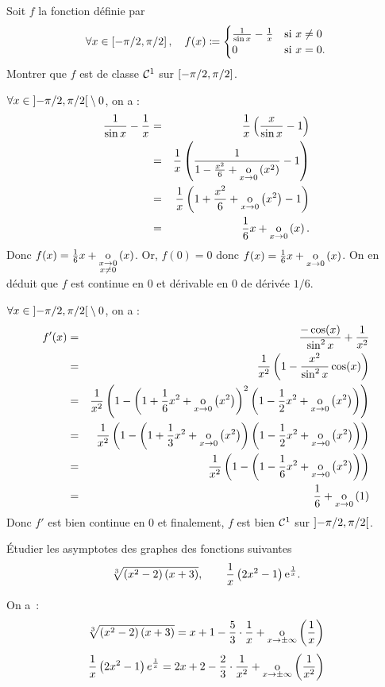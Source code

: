 \documentclass{magnolia}
\begin{document}
Soit $f$ la fonction définie par
\[\forall x\in\left[-\pi/2,\pi/2\right] ,\quad f(x)\coloneqq
  \begin{cases}
  \frac{1}{\sin x}-\frac{1}{x} & \text{si $x\neq 0$}\\
  0 & \text{si $x=0$.}
  \end{cases}\]
Montrer que $f$ est de classe $\mathcal{C}^{1}$ sur $\left[-\pi/2,\pi/2\right]$.

\begin{sol}
$\forall x \in \left]-\pi/2,\pi/2\right[\setminus{0}$, on a :
\begin{eqnarray*}
\frac{1}{\sin x}-\frac{1}{x}&=&\frac{1}{x}\left(\frac{x}{\sin x}-1\right)\\
&=&\frac{1}{x}\left(\frac{1}{1-\frac{x^2}{6}+\underset{x \rightarrow 0}{\text{o}}\left(x^2\right)}-1\right)\\
&=&\frac{1}{x}\left(1+\frac{x^2}{6}+\underset{x \rightarrow 0}{\text{o}}\left(x^2\right)-1\right)\\
&=&\frac{1}{6}x+\underset{x \rightarrow 0}{\text{o}}\left(x\right).
\end{eqnarray*}
Donc $f(x)=\frac{1}{6}x+\underset{\substack{x \rightarrow 0\\x\neq 0}}{\text{o}} \left(x\right)$. Or, $f(0)=0$ donc $f(x)=\frac{1}{6}x+\underset{x \rightarrow 0}{\text{o}}\left(x\right)$. On en déduit que $f$ est continue en $0$ et dérivable en $0$ de dérivée $1/6$.

$\forall x \in \left]-\pi/2,\pi/2\right[\setminus{0}$, on a :
\begin{eqnarray*}
f'(x)&=&\frac{-\cos(x)}{\sin^2 x}+\frac{1}{x^2}\\
&=&\frac{1}{x^2}\left(1-\frac{x^2}{\sin^2 x}\cos(x)\right)\\
&=&\frac{1}{x^2}\left(1-\left(1+\frac{1}{6}x^2+\underset{x \rightarrow 0}{\text{o}}\left(x^2\right)\right)^2\left(1-\frac{1}{2}x^2+\underset{x \rightarrow 0}{\text{o}}\left(x^2\right)\right)\right)\\
&=&\frac{1}{x^2}\left(1-\left(1+\frac{1}{3}x^2+\underset{x \rightarrow 0}{\text{o}}\left(x^2\right)\right)\left(1-\frac{1}{2}x^2+\underset{x \rightarrow 0}{\text{o}}\left(x^2\right)\right)\right)\\
&=&\frac{1}{x^2}\left(1-\left(1-\frac{1}{6}x^2+\underset{x \rightarrow 0}{\text{o}}\left(x^2\right)\right)\right)\\
&=&\frac{1}{6}+\underset{x \rightarrow 0}{\text{o}}\left(1\right)
\end{eqnarray*}
Donc $f'$ est bien continue en $0$ et finalement, $f$ est bien $\mathcal{C}^{1}$ sur $\left]-\pi/2,\pi/2\right[$.

\end{sol}


Étudier les asymptotes des graphes des fonctions suivantes
\[\sqrt[3]{\left(x^2-2\right)\left(x+3\right)}, \qquad \frac{1}{x}\left(2x^2-1\right){\rm e}^{\frac{1}{x}}.\]
\begin{sol}
On a~:
\[\sqrt[3]{\left(x^2-2\right)\left(x+3\right)}=x+1-\frac{5}{3}\cdot\frac{1}{x}+\underset{x \rightarrow \pm\infty}{\text{o}}\left(\frac{1}{x}\right)\]
\[\frac{1}{x}\left(2x^2-1\right)e^{\frac{1}{x}}=2x+2-\frac{2}{3}\cdot\frac{1}{x^2}+\underset{x \rightarrow \pm\infty}{\text{o}}\left(\frac{1}{x^2}\right)\]
\end{sol}
\end{document}
